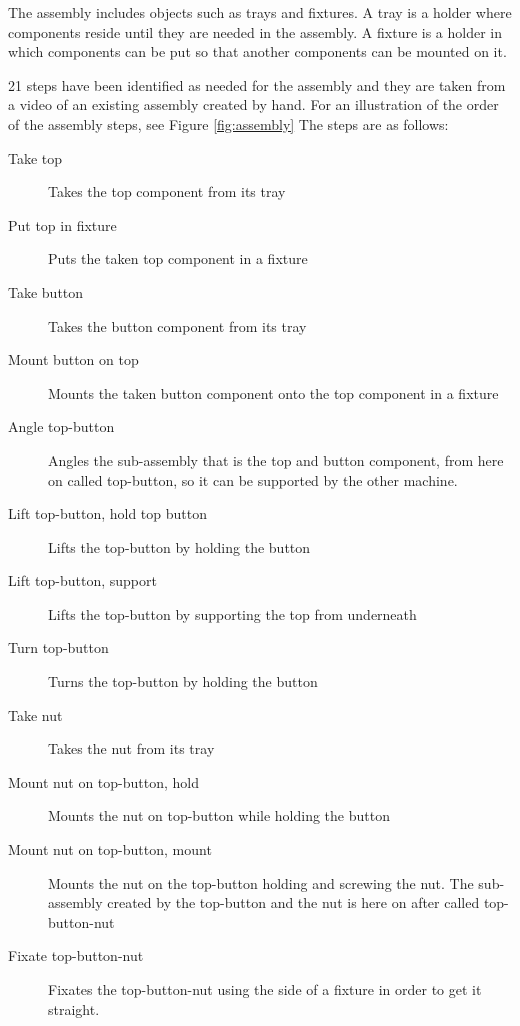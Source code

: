 The assembly includes objects such as trays and fixtures. A tray is a holder where components reside until they are needed in the assembly. A fixture is a holder in which components can be put so that another components can be mounted on it.

21 steps have been identified as needed for the assembly and they are taken from a video of an existing assembly created by hand. For an illustration of the order of the assembly steps, see Figure \ref{fig:assembly} The steps are as follows:

\begin{description}
\item[Take top] Takes the top component from its tray

\item[Put top in fixture] Puts the taken top component in a fixture

\item[Take button] Takes the button component from its tray

\item[Mount button on top] Mounts the taken button component onto the top component in a fixture

\item[Angle top-button] Angles the sub-assembly that is the top and button component, from here on called top-button, so it can be supported by the other machine.

\item[Lift top-button, hold top button] Lifts the top-button by holding the button

\item[Lift top-button, support] Lifts the top-button by supporting the top from underneath

\item[Turn top-button] Turns the top-button by holding the button

\item[Take nut] Takes the nut from its tray

\item[Mount nut on top-button, hold] Mounts the nut on top-button while holding the button

\item[Mount nut on top-button, mount] Mounts the nut on the top-button holding and screwing the nut. The sub-assembly created by the top-button and the nut is here on after called top-button-nut

\item[Fixate top-button-nut] Fixates the top-button-nut using the side of a fixture in order to get it straight.


\end{description}
